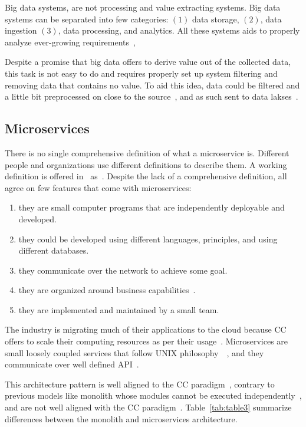 Big data systems, are not processing and value extracting systems. Big data systems can be separated into few categories: $(1)$ data storage, $(2)$, data ingestion $(3)$, data processing, and analytics. All these systems aids to properly analyze ever-growing requirements~\cite{RaoMBG19},

Despite a promise that big data offers to derive value out of the collected data, this task is not easy to do and requires properly set up system filtering and removing data that contains no value. To aid this idea, data could be filtered and a little bit preprocessed on close to the source~\cite{inproceedingsSimic1}, and as such sent to data lakses~\cite{MarynowskiSP15}.
%
%
\subsection{Microservices}\label{sec:microservices}
%
There is no single comprehensive definition of what a microservice is. Different people and organizations use different definitions to describe them. A working definition is offered in~\cite{DragoniGLMMMS16} as~. Despite the lack of a comprehensive definition, all agree on few features that come with microservices:

\begin{enumerate}[start=1,label={(\bfseries \arabic*)}]
	\item they are small computer programs that are independently deployable and developed.
	\item they could be developed using different languages, principles, and using different databases.
	\item they communicate over the network to achieve some goal.
	\item they are organized around business capabilities~\cite{PautassoZALJ17}.
	\item they are implemented and maintained by a small team.
\end{enumerate}

The industry is migrating much of their applications to the cloud because CC offers to scale their computing resources as per their usage~\cite{LiZJLZLGGS19}. Microservices are small loosely coupled services that follow UNIX philosophy~~\cite{krause2015microservices}, and they communicate over well defined API~\cite{DragoniGLMMMS16}.

This architecture pattern is well aligned to the CC paradigm~\cite{LiZJLZLGGS19}, contrary to previous models like monolith whose modules cannot be executed independently~\cite{DragoniGLMMMS16, abs-1905-07997}, and are not well aligned with the CC paradigm~\cite{abs-1905-07997}. Table~\ref{tab:table3} summarize differences between the monolith and microservices architecture.


